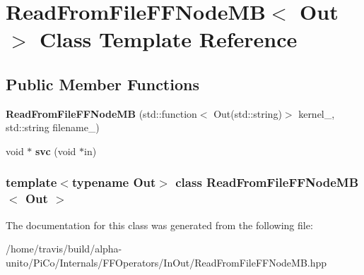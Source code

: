 \hypertarget{class_read_from_file_f_f_node_m_b}{\section{\-Read\-From\-File\-F\-F\-Node\-M\-B$<$ \-Out $>$ \-Class \-Template \-Reference}
\label{class_read_from_file_f_f_node_m_b}
}
\subsection*{\-Public \-Member \-Functions}
\begin{DoxyCompactItemize}
\item 
\hypertarget{class_read_from_file_f_f_node_m_b_a16b4ed3bd25ff2ede113f868a3ae2f26}{{\bfseries \-Read\-From\-File\-F\-F\-Node\-M\-B} (std\-::function$<$ \-Out(std\-::string)$>$ kernel\-\_\-, std\-::string filename\-\_\-)}\label{class_read_from_file_f_f_node_m_b_a16b4ed3bd25ff2ede113f868a3ae2f26}

\item 
\hypertarget{class_read_from_file_f_f_node_m_b_aebc4fe338d07c777f2a58001f27597e5}{void $\ast$ {\bfseries svc} (void $\ast$in)}\label{class_read_from_file_f_f_node_m_b_aebc4fe338d07c777f2a58001f27597e5}

\end{DoxyCompactItemize}
\subsubsection*{template$<$typename Out$>$ class Read\-From\-File\-F\-F\-Node\-M\-B$<$ Out $>$}



\-The documentation for this class was generated from the following file\-:\begin{DoxyCompactItemize}
\item 
/home/travis/build/alpha-\/unito/\-Pi\-Co/\-Internals/\-F\-F\-Operators/\-In\-Out/\-Read\-From\-File\-F\-F\-Node\-M\-B.\-hpp\end{DoxyCompactItemize}
